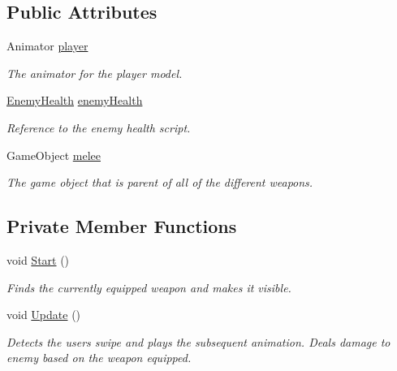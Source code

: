 \subsection*{Public Attributes}
\begin{DoxyCompactItemize}
\item 
Animator \mbox{\hyperlink{class_player_controller_aac0180b11bcec5b39fb92d0b49634f63}{player}}
\begin{DoxyCompactList}\small\item\em The animator for the player model. \end{DoxyCompactList}\item 
\mbox{\hyperlink{class_enemy_health}{Enemy\+Health}} \mbox{\hyperlink{class_player_controller_a1b009736f936d8ddb20ec86b8c694fba}{enemy\+Health}}
\begin{DoxyCompactList}\small\item\em Reference to the enemy health script. \end{DoxyCompactList}\item 
Game\+Object \mbox{\hyperlink{class_player_controller_a4b87339adc04e87928d5b6903d07ec1e}{melee}}
\begin{DoxyCompactList}\small\item\em The game object that is parent of all of the different weapons. \end{DoxyCompactList}\end{DoxyCompactItemize}
\subsection*{Private Member Functions}
\begin{DoxyCompactItemize}
\item 
void \mbox{\hyperlink{class_player_controller_ae1117d9c4da3193181cddad2c814e467}{Start}} ()
\begin{DoxyCompactList}\small\item\em Finds the currently equipped weapon and makes it visible. \end{DoxyCompactList}\item 
void \mbox{\hyperlink{class_player_controller_ae8bc83dffb99867a04be016473ed2c43}{Update}} ()
\begin{DoxyCompactList}\small\item\em Detects the users swipe and plays the subsequent animation. Deals damage to enemy based on the weapon equipped. \end{DoxyCompactList}\end{DoxyCompactItemize}


